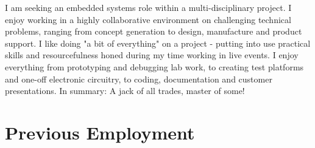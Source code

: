 \documentclass[]{deedy-resume-openfont-wjl}
\begin{document}
%
%


%
%
\vspace{-\topsep} %
\begin{center}
  \vspace{-\topsep} %
  \huge\color{subheadings}
\end{center}
I am seeking an embedded systems role within a multi-disciplinary project.
I enjoy working in a highly collaborative environment on challenging technical problems, ranging from concept generation to design, manufacture and product support.
I like doing "a bit of everything" on a project - putting into use practical skills and resourcefulness honed during my time working in live events.
I enjoy everything from prototyping and debugging lab work, to creating test platforms and one-off electronic circuitry, to coding, documentation and customer presentations.
\newline
In summary: A jack of all trades, master of some!

%
%
\sectionsep{}\section{Previous Employment}












\end{document}
